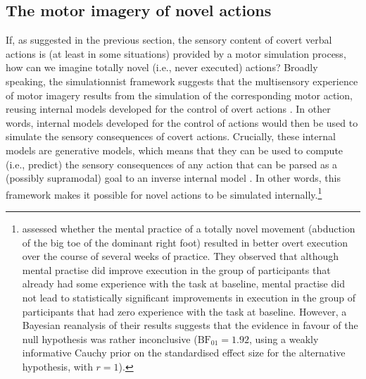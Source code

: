 \documentclass[utf8]{template/frontiersSCNS} %
\begin{document}

\subsection{The motor imagery of novel actions}

If, as suggested in the previous section, the sensory content of covert verbal actions is (at least in some situations) provided by a motor simulation process, how can we imagine totally novel (i.e., never executed) actions? Broadly speaking, the simulationnist framework suggests that the multisensory experience of motor imagery results from the simulation of the corresponding motor action, reusing internal models developed for the control of overt actions \citep[e.g.,][]{jeannerod_representing_1994}. In other words, internal models developed for the control of actions would then be used to simulate the sensory consequences of covert actions. Crucially, these internal models are generative models, which means that they can be used to compute (i.e., predict) the sensory consequences of any action that can be parsed as a (possibly supramodal) goal to an inverse internal model \citep{loevenbruck_cognitive_2018}. In other words, this framework makes it possible for novel actions to be simulated internally.\footnote{\cite{mulder_role_2004} assessed whether the mental practice of a totally novel movement (abduction of the big toe of the dominant right foot) resulted in better overt execution over the course of several weeks of practice. They observed that although mental practise did improve execution in the group of participants that already had some experience with the task at baseline, mental practise did not lead to statistically significant improvements in execution in the group of participants that had zero experience with the task at baseline. However, a Bayesian reanalysis of their results suggests that the evidence in favour of the null hypothesis was rather inconclusive ($\text{BF}_{01} = 1.92$, using a weakly informative Cauchy prior on the standardised effect size for the alternative hypothesis, with $r = 1$).}
\end{document}
